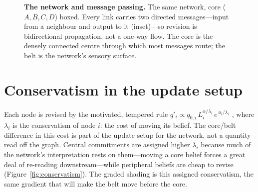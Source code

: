 \documentclass[11pt,a4paper]{article}
\newcommand{\biarrow}[2]{%
  \draw[msg] (#1) to[bend left=7] (#2);
  \draw[msg] (#2) to[bend left=7] (#1);}
\def\corelist{A/0/0, B/2.4/0, C/0/-2.4, D/2.4/-2.4}
\def\periphlist{%
  pA1/-2.1/1.0/a_1, pA2/-0.4/1.9/a_2, pA3/-2.3/-0.6/a_3,
  pB1/2.8/1.9/, pB2/4.5/1.0/, pB3/4.7/-0.5/,
  pC1/-2.3/-1.8/, pC2/-2.1/-3.4/, pC3/-0.4/-4.3/,
  pD1/2.8/-4.3/, pD2/4.5/-3.4/, pD3/4.7/-1.9/}
\def\coreedges{A/B, A/C, B/D, C/D, A/D}
\def\periphedges{A/pA1, A/pA2, A/pA3, B/pB1, B/pB2, B/pB3,
                 C/pC1, C/pC2, C/pC3, D/pD1, D/pD2, D/pD3}
\def\crossedges{pA1/pA2, pA2/pB1, pB3/pD3, pD1/pC3, pA3/pC1}
\newcommand{\beliefnetbase}[2]{%
  \foreach \n/\x/\y in \corelist {\node[#1] (\n) at (\x,\y) {$\n$};}
  \foreach \n/\x/\y/\lab in \periphlist {\node[#2] (\n) at (\x,\y) {$\lab$};}
  \begin{scope}[on background layer]
    \foreach \a/\b in \coreedges  {\biarrow{\a}{\b}}
    \foreach \a/\b in \periphedges{\biarrow{\a}{\b}}
    \foreach \a/\b in \crossedges {\biarrow{\a}{\b}}
  \end{scope}}
\begin{document}
\begin{figure}[t]
\centering
{}
\caption{\textbf{The network and message passing.} The same network, core
($A,B,C,D$) boxed. Every link carries two directed messages---input from a
neighbour and output to it (inset)---so revision is bidirectional propagation,
not a one-way flow. The core is the densely connected centre through which most
messages route; the belt is the network's sensory surface.}
\label{fig:anatomy}
\end{figure}

\section{Conservatism in the update setup}

Each node is revised by the motivated, tempered rule
$q'_i\propto q_{0,i}\,L_i^{\alpha/\lambda_i}\,e^{\,u_i/\lambda_i}$
\citep{hylandAlbarracin2025MindChange}, where $\lambda_i$ is the conservatism of
node $i$: the cost of moving its belief. The core/belt difference in this cost
is part of the update setup for the network, not a quantity read off the
graph. Central commitments are assigned higher $\lambda_i$ because much of the
network's interpretation rests on them---moving a core belief forces a great
deal of re-reading downstream---while peripheral beliefs are cheap to revise
(Figure~\ref{fig:conservatism}). The graded shading is this assigned
conservatism, the same gradient that will make the belt move before the core.
\end{document}
